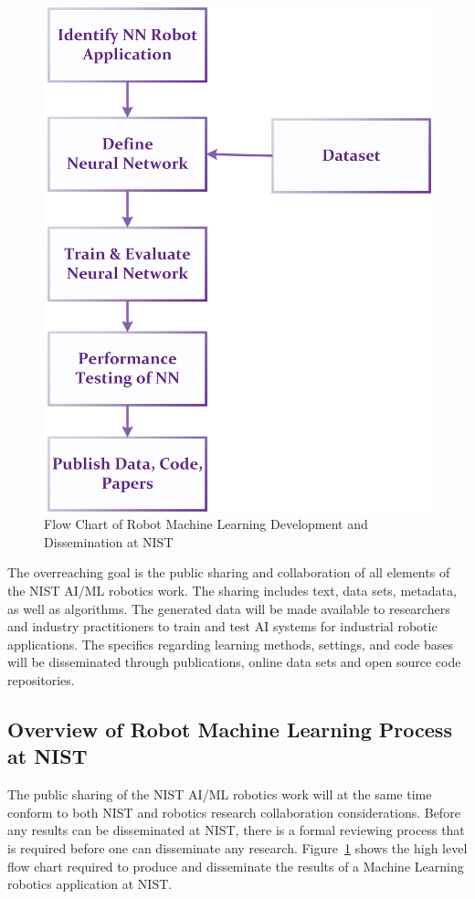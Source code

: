 \begin{figure}[!h]
\centering
\includegraphics*[]{./Figure/NIST_AI_Flowchart.jpg}
\caption{Flow Chart of Robot Machine Learning Development and Dissemination at NIST}
\label{fg:aiml_flowchart} 
\end{figure}
The overreaching goal is the public sharing and collaboration of all elements of the NIST AI/ML robotics work. The sharing includes text, data sets, metadata, as well as algorithms. The generated data will be made available to researchers and industry practitioners to train and test AI systems for industrial robotic applications. The specifics regarding learning methods, settings, and code bases will be disseminated through publications, online data sets and open source code repositories. 


\subsection{Overview of Robot Machine Learning Process at NIST}
The public sharing of the NIST AI/ML robotics work will at the same time conform to both NIST and robotics research collaboration considerations.  Before any results can be disseminated at NIST, there is a  formal reviewing process that is required before one can disseminate any research.
Figure~\ref{fg:aiml_flowchart} shows the high level flow chart required to produce and disseminate the results of a Machine Learning robotics application at NIST. 

